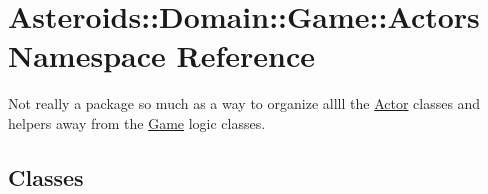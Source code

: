 \hypertarget{namespaceAsteroids_1_1Domain_1_1Game_1_1Actors}{}\section{Asteroids\+:\+:Domain\+:\+:Game\+:\+:Actors Namespace Reference}
\label{namespaceAsteroids_1_1Domain_1_1Game_1_1Actors}


Not really a package so much as a way to organize allll the \hyperlink{classAsteroids_1_1Domain_1_1Game_1_1Actors_1_1Actor}{Actor} classes and helpers away from the \hyperlink{classAsteroids_1_1Domain_1_1Game_1_1Game}{Game} logic classes.  


\subsection*{Classes}
